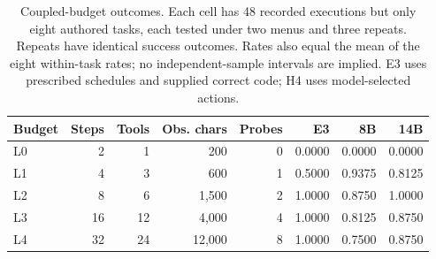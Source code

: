 \begin{table}[t]
\centering\small
\caption{Coupled-budget outcomes. Each cell has 48 recorded executions but only eight authored tasks, each tested under two menus and three repeats. Repeats have identical success outcomes. Rates also equal the mean of the eight within-task rates; no independent-sample intervals are implied. E3 uses prescribed schedules and supplied correct code; H4 uses model-selected actions.}
\label{tab:curves}
\begin{tabular}{lrrrrrrr}
\toprule
Budget & Steps & Tools & Obs. chars & Probes & E3 & 8B & 14B \\
\midrule
L0 & 2 & 1 & 200 & 0 & 0.0000 & 0.0000 & 0.0000 \\
L1 & 4 & 3 & 600 & 1 & 0.5000 & 0.9375 & 0.8125 \\
L2 & 8 & 6 & 1,500 & 2 & 1.0000 & 0.8750 & 1.0000 \\
L3 & 16 & 12 & 4,000 & 4 & 1.0000 & 0.8125 & 0.8750 \\
L4 & 32 & 24 & 12,000 & 8 & 1.0000 & 0.7500 & 0.8750 \\
\bottomrule
\end{tabular}
\end{table}
